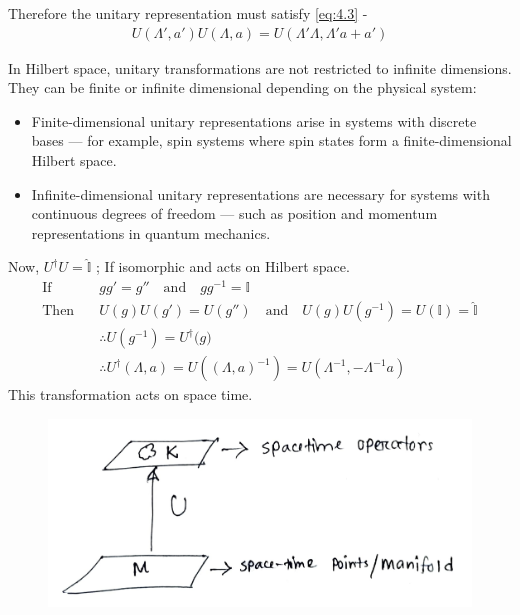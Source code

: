 \documentclass[14pt]{article} %
\begin{document}
Therefore the unitary representation must satisfy \eqref{eq:4.3} -
\begin{align*}
U(\Lambda', a')U(\Lambda, a) = U(\Lambda'\Lambda,\Lambda' a + a') \tag{4.4} \label{eq:4.4}
\end{align*}
\begin{tcolorbox}[ title=\textbf{Note: Dimension of Unitary Transformation in Hilbert Space}]
In Hilbert space, unitary transformations are not restricted to infinite dimensions. They can be finite or infinite dimensional depending on the physical system:

\begin{itemize}
    \item Finite-dimensional unitary representations arise in systems with discrete bases — for example, spin systems where spin states form a finite-dimensional Hilbert space.
    \item Infinite-dimensional unitary representations are necessary for systems with continuous degrees of freedom — such as position and momentum representations in quantum mechanics.
\end{itemize}
\end{tcolorbox}
Now, $U^\dagger U = \hat{\mathbb{I}}$ ; If isomorphic and acts on Hilbert space.
\begin{align*}
    \text{If}\quad &gg'=g'' \quad \text{and} \quad gg^{-1}=\mathbb{I} \\
    \text{Then} \quad & U(g)U(g') = U(g'') \quad \text{and} \quad U(g)U(g^{-1}) = U(\mathbb{I}) = \hat{\mathbb{I}} \\
    &\therefore U(g^{-1}) = U^{\dagger}{(g})\\
    &\therefore U^\dagger(\Lambda,a)=U\left((\Lambda,a)^{-1}\right)=U(\Lambda^{-1},-\Lambda^{-1}a)  \tag{4.5} \label{eq:4.5}
\end{align*}
This transformation acts on space time.
\begin{figure}[H]
\centering
\includegraphics[width=0.6\linewidth]{L1_1.jpg}
\caption*{}
\end{figure}
\end{document}
